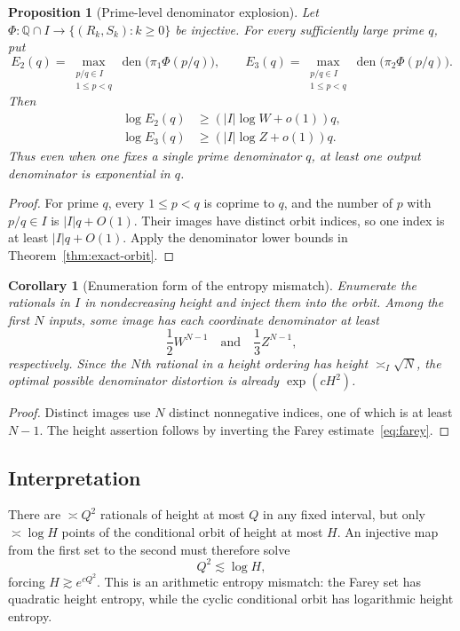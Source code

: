 \documentclass[11pt]{article}
\newtheorem{proposition}[theorem]{Proposition}
\newtheorem{corollary}[theorem]{Corollary}
\theoremstyle{definition}
\theoremstyle{remark}
\newcommand{\Q}{\mathbb Q}
\newcommand{\den}{\operatorname{den}}
\begin{document}
\begin{proposition}[Prime-level denominator explosion]\label{prop:prime-level}
Let $\Phi:\Q\cap I\to\{(R_k,S_k):k\ge0\}$ be injective.  For every sufficiently large
prime $q$, put
\[
 E_2(q)=\max_{\substack{p/q\in I\\1\le p<q}}\den\bigl(\pi_1\Phi(p/q)\bigr),
 \qquad
 E_3(q)=\max_{\substack{p/q\in I\\1\le p<q}}\den\bigl(\pi_2\Phi(p/q)\bigr).
\]
Then
\begin{align}
 \log E_2(q)&\ge (|I|\log W+o(1))q,\label{eq:prime-E2}\\
 \log E_3(q)&\ge (|I|\log Z+o(1))q.\label{eq:prime-E3}
\end{align}
Thus even when one fixes a single prime denominator $q$, at least one output denominator is
exponential in $q$.
\end{proposition}

\begin{proof}
For prime $q$, every $1\le p<q$ is coprime to $q$, and the number of $p$ with $p/q\in I$ is
$|I|q+O(1)$.  Their images have distinct orbit indices, so one index is at least
$|I|q+O(1)$.  Apply the denominator lower bounds in
Theorem~\ref{thm:exact-orbit}.
\end{proof}

\begin{corollary}[Enumeration form of the entropy mismatch]\label{cor:enumeration}
Enumerate the rationals in $I$ in nondecreasing height and inject them into the orbit.  Among
the first $N$ inputs, some image has each coordinate denominator at least
\[
 \frac12W^{N-1}\quad\text{and}\quad\frac13Z^{N-1},
\]
respectively.  Since the $N$th rational in a height ordering has height $\asymp_I\sqrt N$,
the optimal possible denominator distortion is already $\exp(cH^2)$.
\end{corollary}

\begin{proof}
Distinct images use $N$ distinct nonnegative indices, one of which is at least $N-1$.  The
height assertion follows by inverting the Farey estimate~\eqref{eq:farey}.
\end{proof}

\subsection{Interpretation}

There are $\asymp Q^2$ rationals of height at most $Q$ in any fixed interval, but only
$\asymp\log H$ points of the conditional orbit of height at most $H$.  An injective map from
the first set to the second must therefore solve
\[
 Q^2\lesssim\log H,
\]
forcing $H\gtrsim e^{cQ^2}$.  This is an arithmetic entropy mismatch: the Farey set has
quadratic height entropy, while the cyclic conditional orbit has logarithmic height entropy.
\end{document}
